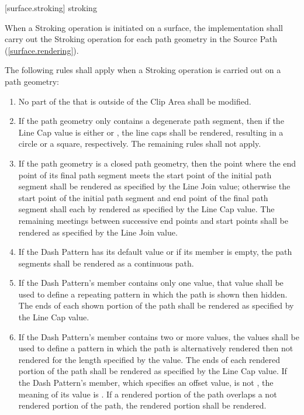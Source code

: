  [surface.stroking] { stroking}

\pnum
When a Stroking operation is initiated on a surface, the implementation shall carry out the Stroking operation for each path geometry in the Source Path (\ref{surface.rendering}).

\pnum
The following rules shall apply when a Stroking operation is carried out on a path geometry:
\begin{enumerate}
\item No part of the \underlyingsurface that is outside of the Clip Area shall be modified.

\item If the path geometry only contains a degenerate path segment, then if the Line Cap value is either  or , the line caps shall be rendered, resulting in a circle or a square, respectively. The remaining rules shall not apply.

\item If the path geometry is a closed path geometry, then the point where the end point of its final path segment meets the start point of the initial path segment shall be rendered as specified by the Line Join value; otherwise the start point of the initial path segment and end point of the final path segment shall each by rendered as specified by the Line Cap value. The remaining meetings between successive end points and start points shall be rendered as specified by the Line Join value.

\item If the Dash Pattern has its default value or if its  member is empty, the path segments shall be rendered as a continuous path.

\item If the Dash Pattern's  member contains only one value, that value shall be used to define a repeating pattern in which the path is shown then hidden. The ends of each shown portion of the path shall be rendered as specified by the Line Cap value.

\item If the Dash Pattern's  member contains two or more values, the values shall be used to define a pattern in which the path is alternatively rendered then not rendered for the length specified by the value. The ends of each rendered portion of the path shall be rendered as specified by the Line Cap value. If the Dash Pattern's  member, which specifies an offset value, is not , the meaning of its value is . If a rendered portion of the path overlaps a not rendered portion of the path, the rendered portion shall be rendered.
\end{enumerate}

